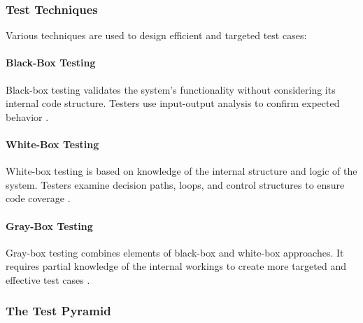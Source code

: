 \subsubsection{Test Techniques}

Various techniques are used to design efficient and targeted test cases:

\paragraph{Black-Box Testing}

Black-box testing validates the system's functionality without considering its internal code structure. Testers use input-output analysis to confirm expected behavior \cite{myers2011art}.

\paragraph{White-Box Testing}

White-box testing is based on knowledge of the internal structure and logic of the system. Testers examine decision paths, loops, and control structures to ensure code coverage \cite{burnstein2003practical}.

\paragraph{Gray-Box Testing}

Gray-box testing combines elements of black-box and white-box approaches. It requires partial knowledge of the internal workings to create more targeted and effective test cases \cite{ammann2016introduction}.

\subsubsection{The Test Pyramid}

